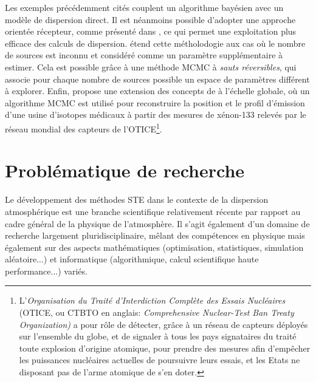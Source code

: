  Les exemples précédemment cités couplent un algorithme bayésien avec un modèle de dispersion direct. Il est néanmoins possible d'adopter une approche orientée récepteur, comme présenté dans \cite{Keats2007}, ce qui permet une exploitation plus efficace des calculs de dispersion. \cite{Yee2008b} étend cette métholodogie aux cas où le nombre de sources est inconnu et considéré comme un paramètre supplémentaire à estimer. Cela est possible grâce à une méthode MCMC à \textit{sauts réversibles}, qui associe pour chaque nombre de sources possible un espace de paramètres différent à explorer. Enfin, \cite{Yee2014} propose une extension des concepts de \cite{Keats2007} à l'échelle globale, où un algorithme MCMC est utilisé pour reconstruire la position et le profil d'émission d'une usine d'isotopes médicaux à partir des mesures de xénon-133 relevés par le réseau mondial des capteurs de l'OTICE\footnote{L'\textit{Organisation du Traité d'Interdiction Complète des Essais Nucléaires} (OTICE, ou CTBTO en anglais: \textit{Comprehensive Nuclear-Test Ban Treaty Organization)} a pour rôle de détecter, grâce à un réseau de capteurs déployés sur l'ensemble du globe, et de signaler à tous les pays signataires du traité toute explosion d'origine atomique, pour prendre des mesures afin d'empêcher les puissances nucléaires actuelles de poursuivre leurs essais, et les Etats ne disposant pas de l'arme atomique de s'en doter.}. \\
 
 
 \section{Problématique de recherche}
 
 Le développement des méthodes STE dans le contexte de la dispersion atmosphérique est une branche scientifique relativement récente par rapport au cadre général de la physique de l'atmosphère. Il s'agit également d'un domaine de recherche largement pluridisciplinaire, mêlant des compétences en physique mais également sur des aspects mathématiques (optimisation, statistiques, simulation aléatoire...) et informatique (algorithmique, calcul scientifique haute performance...) variés. \\
 
